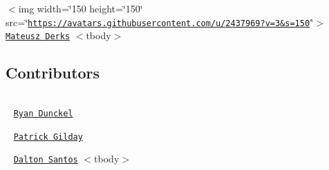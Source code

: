 $<$img width=\char`\"{}150 height=\char`\"{}150\char`\"{}
        src=\char`\"{}\href{https://avatars.githubusercontent.com/u/2437969?v=3&s=150}{\tt https\+://avatars.\+githubusercontent.\+com/u/2437969?v=3\&s=150}"$>$ ~\newline
 \href{https://github.com/ertrzyiks}{\tt Mateusz Derks}   $<$tbody$>$ 

\subsection*{Contributors}

\tabulinesep=1mm
\begin{longtabu} spread 0pt [c]{*{0}{|X[-1]}|}
\hline
\end{longtabu}


 ~\newline
 \href{https://github.com/sparty02}{\tt Ryan Dunckel}  

 ~\newline
 \href{https://github.com/pcgilday}{\tt Patrick Gilday}  

 ~\newline
 \href{https://github.com/daltones}{\tt Dalton Santos}   $<$tbody$>$ 